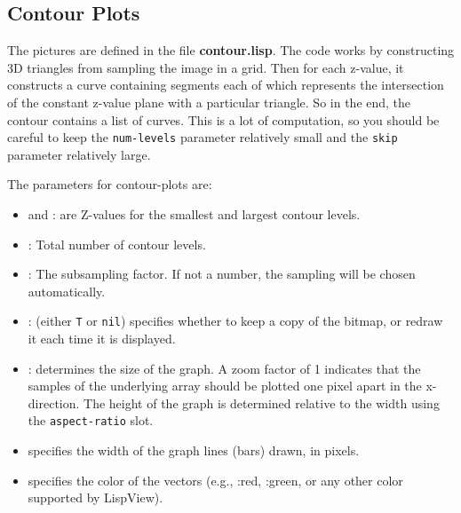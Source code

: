 
\subsection{Contour Plots}
\label{sec:contour-plot}

The  pictures are defined in the file {\bf
contour.lisp}.  The code works by constructing 3D triangles from
sampling the image in a grid.  Then for each z-value, it constructs a
curve containing segments each of which represents the intersection of
the constant z-value plane with a particular triangle.  So in the end,
the contour contains a list of curves.  This is a lot of computation,
so you should be careful to keep the {\tt num-levels} parameter
relatively small and the {\tt skip} parameter relatively large.

The parameters for contour-plots are:
\begin{itemize}
\item {} and : are Z-values for the smallest and
largest contour levels.

\item {}: Total number of contour levels.

\item {}: The subsampling factor.  If not a
number, the sampling will be chosen automatically.

\item {}: (either {\tt T} or {\tt nil}) specifies
whether to keep a copy of the bitmap, or redraw it each time it is
displayed.

\item {}: determines the size of the graph.  A zoom factor of
1 indicates that the samples of the underlying array should be plotted
one pixel apart in the x-direction.  The height of the graph is
determined relative to the width using the {\tt aspect-ratio} slot.

\item {} specifies the width of the graph lines (bars)
drawn, in pixels.

\item {} specifies the color of the vectors (e.g., :red,
:green, or any other color supported by LispView).
\end{itemize}



